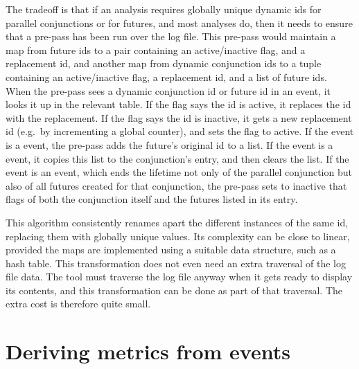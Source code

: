 The tradeoff is that if an analysis requires globally unique dynamic ids
for parallel conjunctions or for futures,
and most analyses do,
then it needs to ensure that a pre-pass has been run over the log file.
This pre-pass would maintain a map from future ids
to a pair containing an active/inactive flag, and a replacement id,
and another map from dynamic conjunction ids
to a tuple containing an active/inactive flag, a replacement id,
and a list of future ids.
When the pre-pass sees a dynamic conjunction id or future id in an event,
it looks it up in the relevant table.
If the flag says the id is active,
it replaces the id with the replacement.
If the flag says the id is inactive,
it gets a new replacement id (e.g.\ by incrementing a global counter),
and sets the flag to active.
If the event is a  event,
the pre-pass adds the future's original id to a list.
If the event is a  event,
it copies this list to the conjunction's entry, and then clears the list.
If the event is an  event,
which ends the lifetime not only of the parallel conjunction
but also of all futures created for that conjunction,
the pre-pass sets to inactive
that flags of both the conjunction itself
and the futures listed in its entry.

This algorithm consistently renames apart
the different instances of the same id,
replacing them with globally unique values.
Its complexity can be close to linear, provided
the maps are implemented using a suitable data structure, such as a hash table.
This transformation does not even need an extra traversal of the log file data.
The \tscope tool must traverse the log file anyway
when it gets ready to display its contents,
and this transformation can be done
as part of that traversal.
The extra cost is therefore quite small.


\section{Deriving metrics from events}
\label{sec:tscope_analysis}

